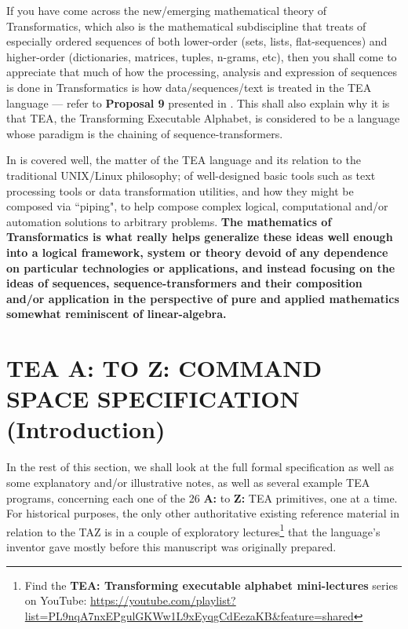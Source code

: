 \documentclass[a4paper, 18pt]{book} %
\begin{document}
If you have come across the new/emerging mathematical theory of Transformatics\cite{Lutalo2025_transformatics_thesis}, which also is the mathematical subdiscipline that treats of especially ordered sequences of both lower-order\cite{Lutalo2025_transformatics_thesis} (sets, lists, flat-sequences) and higher-order\cite{Lutalo2025_transformatics_thesis} (dictionaries, matrices, tuples, n-grams, etc), then you shall come to appreciate that much of how the processing, analysis and expression of sequences is done in Transformatics is how data/sequences/text is treated in the TEA language --- refer to \textbf{Proposal 9} presented in \cite{Lutalo2025_transformatics_thesis}. This shall also explain why it is that TEA, the Transforming Executable Alphabet, is considered to be a language whose paradigm is the chaining of sequence-transformers.

\vspace{1em}

In \cite{cli_tttt} is covered well, the matter of the TEA language and its relation to the traditional UNIX/Linux philosophy; of well-designed basic tools such as text processing tools or data transformation utilities, and how they might be composed via ``piping", to help compose complex logical, computational and/or automation solutions to arbitrary problems. \textbf{The mathematics of Transformatics is what really helps generalize these ideas well enough into a logical framework, system or theory devoid of any dependence on particular technologies or applications, and instead focusing on the ideas of sequences, sequence-transformers and their composition and/or application in the perspective of pure and applied mathematics somewhat reminiscent of linear-algebra.}






\chapter{TEA A: TO Z: COMMAND SPACE SPECIFICATION (Introduction)}
\label{SECTAZ}

In the rest of this section, we shall look at the full formal specification as well as some explanatory and/or illustrative notes, as well as several example TEA programs, concerning each one of the 26 \textbf{A:} to \textbf{Z:} TEA primitives, one at a time. For historical purposes, the only other authoritative existing reference material in relation to the TAZ is in a couple of exploratory lectures\footnote{Find the \textbf{TEA: Transforming executable alphabet mini-lectures} series on YouTube: \url{https://youtube.com/playlist?list=PL9nqA7nxEPgulGKWw1L9xEyqgCdEezaKB&feature=shared}} that the language’s inventor gave mostly before this manuscript was originally prepared.
\end{document}
